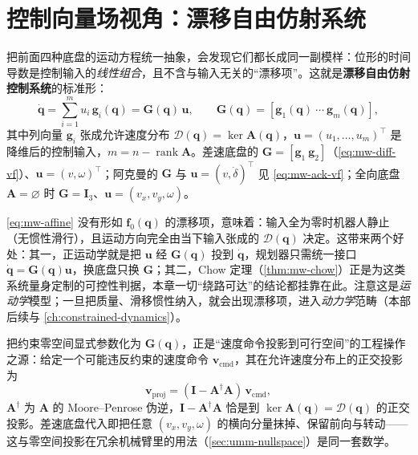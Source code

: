 \section{控制向量场视角：漂移自由仿射系统}
\label{sec:mw-affine}

把前面四种底盘的运动方程统一抽象，会发现它们都长成同一副模样：位形的时间导数是控制输入的\emph{线性组合}，且不含与输入无关的“漂移项”。这就是\textbf{漂移自由仿射控制系统}的标准形：
\begin{equation}
  \dot{\mathbf{q}}=\sum_{i=1}^{m}u_i\,\mathbf{g}_i(\mathbf{q})=\mathbf{G}(\mathbf{q})\,\mathbf{u},
  \qquad \mathbf{G}(\mathbf{q})=[\mathbf{g}_1(\mathbf{q})\ \cdots\ \mathbf{g}_m(\mathbf{q})],
  \label{eq:mw-affine}
\end{equation}
其中列向量 $\mathbf{g}_i$ 张成允许速度分布 $\mathcal{D}(\mathbf{q})=\ker\mathbf{A}(\mathbf{q})$，$\mathbf{u}=(u_1,\dots,u_m)^\top$ 是降维后的控制输入，$m=n-\operatorname{rank}\mathbf{A}$。差速底盘的 $\mathbf{G}=[\mathbf{g}_1\ \mathbf{g}_2]$（\cref{eq:mw-diff-vf}）、$\mathbf{u}=(v,\omega)^\top$；阿克曼的 $\mathbf{G}$ 与 $\mathbf{u}=(v,\dot\delta)^\top$ 见 \cref{eq:mw-ack-vf}；全向底盘 $\mathbf{A}=\varnothing$ 时 $\mathbf{G}=\mathbf{I}_3$、$\mathbf{u}=(v_x,v_y,\omega)$。

\begin{insight}\label{ins:mw-driftfree}
\cref{eq:mw-affine} 没有形如 $\mathbf{f}_0(\mathbf{q})$ 的漂移项，意味着：输入全为零时机器人静止（无惯性滑行），且运动方向完全由当下输入张成的 $\mathcal{D}(\mathbf{q})$ 决定。这带来两个好处：其一，正运动学就是把 $\mathbf{u}$ 经 $\mathbf{G}(\mathbf{q})$ 投到 $\dot{\mathbf{q}}$，规划器只需统一接口 $\dot{\mathbf{q}}=\mathbf{G}(\mathbf{q})\mathbf{u}$，换底盘只换 $\mathbf{G}$；其二，Chow 定理（\cref{thm:mw-chow}）正是为这类系统量身定制的可控性判据，本章一切“绕路可达”的结论都挂靠在此。注意这是\emph{运动学}模型；一旦把质量、滑移惯性纳入，就会出现漂移项，进入\emph{动力学}范畴（本部后续与 \cref{ch:constrained-dynamics}）。
\end{insight}

\noindent 把约束零空间显式参数化为 $\mathbf{G}(\mathbf{q})$，正是“速度命令投影到可行空间”的工程操作之源：给定一个可能违反约束的速度命令 $\mathbf{v}_{\text{cmd}}$，其在允许速度分布上的正交投影为
\begin{equation}
  \mathbf{v}_{\text{proj}}=(\mathbf{I}-\mathbf{A}^{\dagger}\mathbf{A})\,\mathbf{v}_{\text{cmd}},
  \label{eq:mw-project}
\end{equation}
$\mathbf{A}^\dagger$ 为 $\mathbf{A}$ 的 Moore--Penrose 伪逆，$\mathbf{I}-\mathbf{A}^\dagger\mathbf{A}$ 恰是到 $\ker\mathbf{A}(\mathbf{q})=\mathcal{D}(\mathbf{q})$ 的正交投影。差速底盘代入即把任意 $(v_x,v_y,\omega)$ 的横向分量抹掉、保留前向与转动——这与零空间投影在冗余机械臂里的用法（\cref{sec:umm-nullspace}）是同一套数学。

